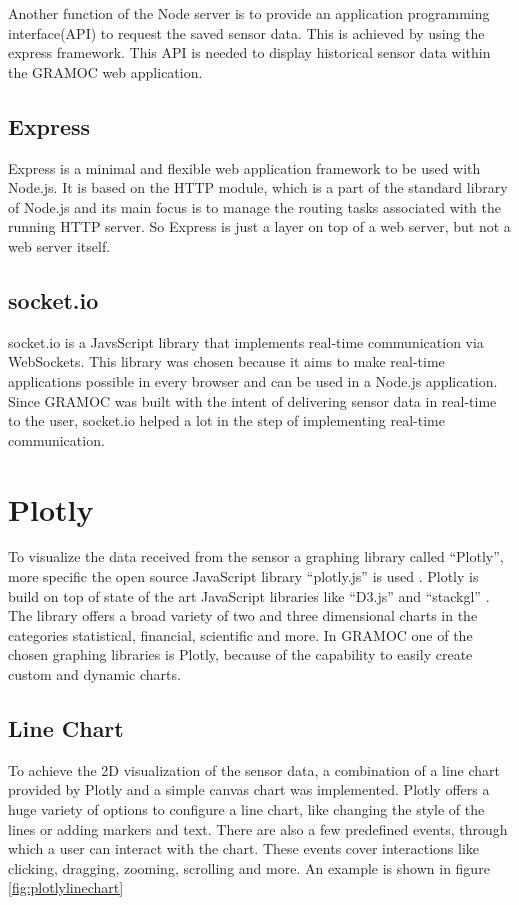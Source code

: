 Another function of the Node server is to provide an application programming interface(API) to request the saved sensor data. This is achieved by using the express framework. This API is needed to display historical sensor data within the GRAMOC web application.

\subsection{Express}
Express is a minimal and flexible web application framework to be used with Node.js. It is based on the HTTP module, which is a part of the standard library of Node.js and its main focus is to manage the routing tasks associated with the running HTTP server. So Express is just a layer on top of a web server, but not a web server itself.

\subsection{socket.io}
\label{subsec:socketio}
socket.io is a JavsScript library that implements real-time communication via WebSockets. This library was chosen because it aims to make real-time applications possible in every browser and can be used in a Node.js application. Since GRAMOC was built with the intent of delivering sensor data in real-time to the user, socket.io helped a lot in the step of implementing real-time communication.


\section{Plotly}
\label{sec:Plotly}
To visualize the data received from the sensor a graphing library called ``Plotly'', more specific the open source JavaScript library ``plotly.js'' is used \autocite{Plotly} \autocite{PlotlyJS}. Plotly is build on top of state of the art JavaScript libraries like ``D3.js''  and ``stackgl'' \autocite{d3} \autocite{stackgl}. The library offers a broad variety of two and three dimensional charts in the categories statistical, financial, scientific and more. In GRAMOC one of the chosen graphing libraries is Plotly, because of the capability to easily create custom and dynamic charts.

\subsection{Line Chart}
To achieve the 2D visualization of the sensor data, a combination of a line chart provided by Plotly and a simple canvas chart was implemented. Plotly offers a huge variety of options to configure a line chart, like changing the style of the lines or adding markers and text. There are also a few predefined events, through which a user can interact with the chart. These events cover interactions like clicking, dragging, zooming, scrolling and more. An example is shown in figure \ref{fig:plotlylinechart}

